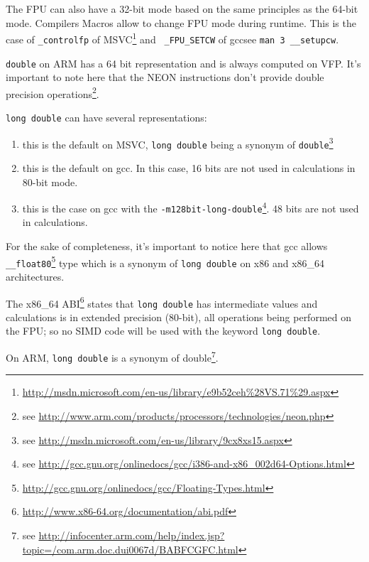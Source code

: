 The FPU can also have a 32-bit mode based on the same principles as the 64-bit mode. Compilers Macros allow to change FPU mode during runtime. This is the case of \texttt{\_controlfp} of MSVC\footnote{\url{http://msdn.microsoft.com/en-us/library/e9b52ceh\%28VS.71\%29.aspx}} and \texttt{\ _FPU\_SETCW} of gcc{see \texttt{man 3 \_\_setupcw}}.

\texttt{double} on ARM has a 64 bit representation and is always computed on VFP. It's important to note here that the NEON instructions don't provide double precision operations\footnote{see \url{http://www.arm.com/products/processors/technologies/neon.php}}.


\texttt{long double} can have several representations:
\begin{enumerate}
\item[\enumstyle{64-bit}] this is the default on MSVC, \texttt{long double} being a synonym of \texttt{double}\footnote{see \url{http://msdn.microsoft.com/en-us/library/9cx8xs15.aspx}}
\item[\enumstyle{96-bit}] this is the default on gcc. In this case, 16 bits are not used in calculations in 80-bit mode.
\item[\enumstyle{128-bit}] this is the case on gcc with the \texttt{-m128bit-long-double}\footnote{see \url{http://gcc.gnu.org/onlinedocs/gcc/i386-and-x86\_002d64-Options.html}}. 48 bits are not used in calculations.
\end{enumerate}

For the sake of completeness, it's important to notice here that gcc allows \texttt{\_\_float80}\footnote{\url{http://gcc.gnu.org/onlinedocs/gcc/Floating-Types.html}} type which is a synonym of \texttt{long double} on x86 and x86\_64 architectures.


The x86\_64 ABI\footnote{\url{http://www.x86-64.org/documentation/abi.pdf}} states that \texttt{long double} has intermediate values and calculations is in extended precision (80-bit), all operations being performed on the FPU; so no SIMD code will be used with the keyword \texttt{long double}.

On ARM, \texttt{long double} is a synonym of double\footnote{see \url{http://infocenter.arm.com/help/index.jsp?topic=/com.arm.doc.dui0067d/BABFCGFC.html}}.


